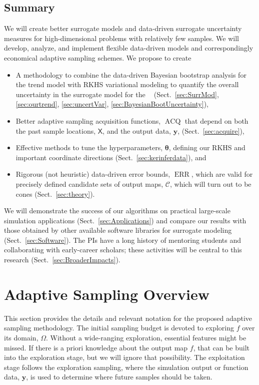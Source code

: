 \documentclass[11pt]{NSFamsart}
\DeclareMathOperator{\QOI}{QOI} %
\DeclareMathOperator{\APP}{\widehat{\QOI}}
\DeclareMathOperator{\ERR}{ERR}
\DeclareMathOperator{\VAL}{ACQ}
\newcommand{\mX}{\mathsf{X}}
\newcommand{\by}{{\boldsymbol{y}}}
\newcommand{\btheta}{{\boldsymbol{\theta}}}
\newcommand{\calc}{{\mathcal{C}}}
\begin{document}
\subsection{Summary} 
We will create better surrogate models and data-driven surrogate uncertainty measures for high-dimensional problems with relatively few samples. We will develop, analyze, and implement flexible data-driven models and correspondingly economical adaptive sampling schemes. We propose to create
\begin{itemize}
\item A methodology to combine the data-driven Bayesian bootstrap analysis for the trend model with RKHS variational modeling to quantify the overall uncertainty in the surrogate model for the $\APP$ (Sect.\ \ref{sec:SurrMod}, \ref{sec:ourtrend},  \ref{sec:uncertVar}, \ref{sec:BayesianBootUncertainty}),
\item Better adaptive sampling acquisition functions, $\VAL$ that depend on both the past sample locations, $\mX$, and the output data, $\by$, (Sect.\ \ref{sec:acquire}),
\item Effective methods to tune the hyperparameters, $\btheta$, defining our RKHS and important coordinate directions (Sect.\ \ref{sec:kerinferdata}), and
\item Rigorous (not heuristic) data-driven error bounds, $\ERR$, which are valid for precisely defined candidate sets of output maps, $\calc$, which will turn out to be cones (Sect.\ \ref{sec:theory}).
\end{itemize}
We will demonstrate the success of our algorithms on practical large-scale simulation applications (Sect.\ \ref{sec:Applications}) and compare our results with those obtained by other available software libraries for surrogate modeling (Sect.\ \ref{sec:Software}). The PIs have a long history of mentoring students and collaborating with early-career scholars; these activities will be central to this research (Sect.\ \ref{sec:BroaderImpacts}). 

\section{Adaptive Sampling Overview} \label{sec:overview}
This section provides the details and relevant notation for the proposed adaptive sampling methodology. The initial sampling budget is devoted to exploring $f$ over its domain, $\Omega$. Without a wide-ranging exploration, essential features might be missed. If there is a priori knowledge about the output map $f$, that can be built into the exploration stage, but we will ignore that possibility. The exploitation stage follows the exploration sampling, where the simulation output or function data, $\by$, is used to determine where future samples should be taken.
\end{document}
